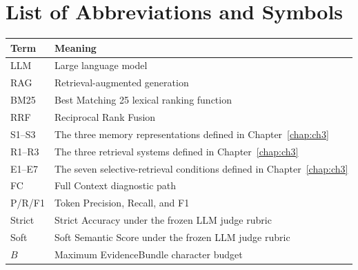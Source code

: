 \chapter*{List of Abbreviations and Symbols}

\begin{longtable}{@{}p{}p{}@{}}
\toprule
\textbf{Term} & \textbf{Meaning} \\
\midrule
\endhead
LLM & Large language model \\
RAG & Retrieval-augmented generation \\
BM25 & Best Matching 25 lexical ranking function \\
RRF & Reciprocal Rank Fusion \\
S1--S3 & The three memory representations defined in Chapter~\ref{chap:ch3} \\
R1--R3 & The three retrieval systems defined in Chapter~\ref{chap:ch3} \\
E1--E7 & The seven selective-retrieval conditions defined in Chapter~\ref{chap:ch3} \\
FC & Full Context diagnostic path \\
P/R/F1 & Token Precision, Recall, and F1 \\
Strict & Strict Accuracy under the frozen LLM judge rubric \\
Soft & Soft Semantic Score under the frozen LLM judge rubric \\
$B$ & Maximum EvidenceBundle character budget \\
\bottomrule
\end{longtable}
